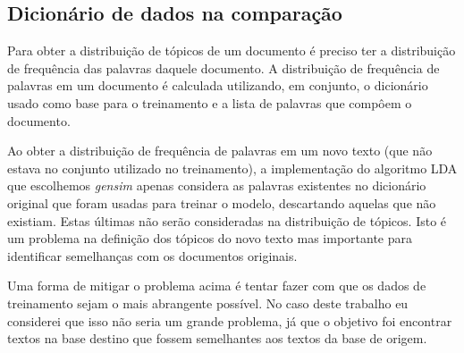 \subsection{Dicionário de dados na comparação}

Para obter a distribuição de tópicos de um documento é preciso ter a distribuição de frequência das palavras daquele documento. A distribuição
de frequência de palavras em um documento é calculada utilizando, em conjunto, o dicionário usado como base para o treinamento e a lista de palavras 
que compôem o documento.

Ao obter a distribuição de frequência de palavras em um novo texto (que não estava no conjunto utilizado no treinamento), a implementação do 
algoritmo LDA que escolhemos \textit{gensim} apenas considera as palavras existentes no dicionário original que foram usadas para treinar o modelo, 
descartando aquelas que não existiam. Estas últimas não serão consideradas na distribuição de tópicos. Isto é um problema na definição dos tópicos 
do novo texto mas importante para identificar semelhanças com os documentos originais.

Uma forma de mitigar o problema acima é tentar fazer com que os dados de treinamento sejam o mais abrangente possível. No caso deste trabalho
eu considerei que isso não seria um grande problema, já que o objetivo foi encontrar textos na base destino que fossem semelhantes aos textos da 
base de origem.
